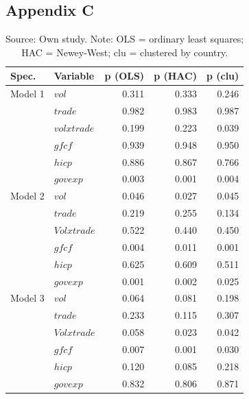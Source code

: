 \subsection{Appendix C}\label{appendC}

\begin{table}[H]
    \centering
    \caption{P-values under alternative covariance estimators.}
    \vspace{\baselineskip}
    \begin{tabular}{llrrr}
        \toprule
        \textbf{Spec.} & \textbf{Variable} & \textbf{p (OLS)} & \textbf{p (HAC)} & \textbf{p (clu)} \\
        \midrule
        Model 1 & $vol$                & 0.311 & 0.333 & 0.246 \\
         & $trade$           & 0.982 & 0.983 & 0.987 \\
         & $vol x trade$  & 0.199 & 0.223 & 0.039 \\
         & $gfcf$                      & 0.939 & 0.948 & 0.950 \\
         & $hicp$                      & 0.886 & 0.867 & 0.766 \\
         & $govexp$    & 0.003 & 0.001 & 0.004 \\
        \midrule
        Model 2 & $vol$                & 0.046 & 0.027 & 0.045 \\
         & $trade$          & 0.219 & 0.255 & 0.134 \\
         & $Vol x trade$ & 0.522  & 0.440 & 0.450 \\
         & $gfcf$                      & 0.004 & 0.011 & 0.001 \\
         & $hicp$                      & 0.625 & 0.609 & 0.511 \\
         & $govexp$    & 0.001 & 0.002 & 0.025 \\
        \midrule
        Model 3 & $vol$                & 0.064 & 0.081 & 0.198 \\
         & $trade$           & 0.233 & 0.115 & 0.307 \\
         & $Vol x trade$ & 0.058  & 0.023 & 0.042 \\
         & $gfcf$                      & 0.007 & 0.001 & 0.030 \\
         & $hicp$                      & 0.120 & 0.085 & 0.218 \\
         & $govexp$    & 0.832 & 0.806 & 0.871 \\
        \bottomrule
    \end{tabular}
    \vspace{\baselineskip}
    \caption*{\footnotesize Source: Own study. Note: OLS = ordinary least squares; HAC = Newey-West; clu = clustered by country.}
    \label{tab:se_alt}
\end{table}

